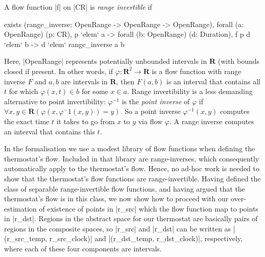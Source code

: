 \documentclass[runningheads]{llncs}
\def\phi{\varphi}
\newcommand{\IR}{{\mathbf R}}
\begin{document}
A flow function |f| on |CR| is {\em range invertible\/} if
\begin{code}
  exists (range_inverse: OpenRange -> OpenRange -> OpenRange),
    forall (a: OpenRange) (p: CR), p `elem` a ->
    forall (b: OpenRange) (d: Duration), f p d `elem` b -> d `elem` range_inverse a b
\end{code}
Here, |OpenRange| represents potentially unbounded intervals in $\IR$
(with bounds closed if present. In other words, if $\phi : \IR^2
\rightarrow \IR$ is a flow function with range inverse $F$ and $a,b$
are intervals in $\IR$, then $F(a,b)$ is an interval that contains all
$t$ for which $\phi(x,t)\in b$ for some $x\in a$. 
Range invertibility is a less demanding alternative to point
invertibility: $\phi^{-1}$ is the {\em point inverse\/} of $\phi$ if
$\forall x,y\in \IR (\phi (x, \phi^-1(x,y)) =y)$. So a point inverse
$\phi^{-1}(x,y)$ computes the exact time $t$ it takes to go from $x$
to $y$ via flow $\phi$. A range inverse computes an interval that
contains this $t$.

In the formalisation we use a modest library
of flow functions when defining the thermostat's flow. Included in
that library are range-inverses, which consequently automatically
apply to the thermostat's flow. Hence, no ad-hoc work is needed to
show that the thermostat's flow functions are range-invertible.
Having defined the class of separable range-invertible flow functions,
and having argued that the thermostat's flow is in this class, we now
show how to proceed with our over-estimation of existence of points in
|r_src| which the flow function map to points in |r_dst|. 
Regions in the abstract space for our thermostat are basically pairs
of regions in the composite spaces, so |r_src| and |r_dst| can be
written as |(r_src_temp, r_src_clock)| and |(r_dst_temp,
r_dst_clock)|, respectively, where each of these four components are
intervals.
\end{document}
